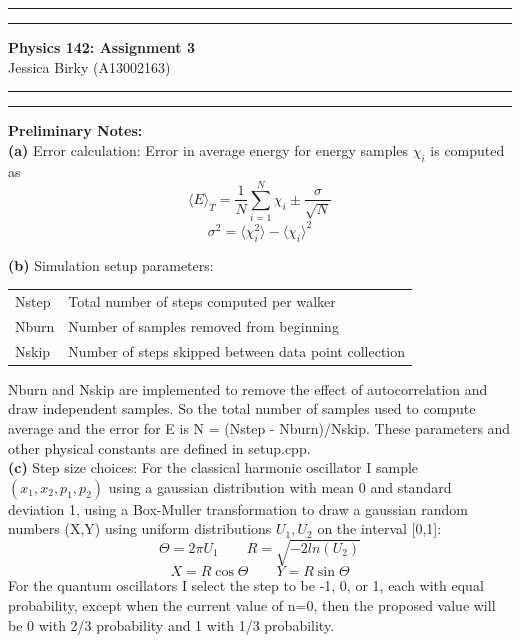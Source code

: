 \documentclass{article}
\newcommand{\mytitle}{Physics 142: Assignment 3}
\begin{document}
\hrule \vspace{1pt} \hrule 
\begin{center}\Large \textbf{\sc \mytitle} \\
\normalsize \sc Jessica Birky (A13002163)
\end{center}
\hrule \vspace{1pt} \hrule 


\bigskip
\textbf{Preliminary Notes:} \\

\textbf{(a)} Error calculation: Error in average energy for energy samples $\chi_{i}$ is computed as 
	\[\langle E\rangle_{T}=\frac{1}{N}\sum_{i=1}^{N} \chi_{i} \pm \frac{\sigma}{\sqrt{N}} \]
	\[\sigma^{2} = \langle \chi_{i}^{2} \rangle - \langle \chi_{i} \rangle^{2} \]

\textbf{(b)} Simulation setup parameters:

\begin{table}[H]
\centering
\begin{tabular}{|l|l|}
	\hline
	Nstep    & Total number of steps computed per walker \\
	Nburn    & Number of samples removed from beginning \\
	Nskip    & Number of steps skipped between data point collection \\
	\hline
\end{tabular}
\end{table}
Nburn and Nskip are implemented to remove the effect of autocorrelation and draw independent samples. So the total number of samples used to compute average and the error for E is N = (Nstep - Nburn)/Nskip. These parameters and other physical constants are defined in setup.cpp. \\

\textbf{(c)} Step size choices: For the classical harmonic oscillator I sample $(x_1, x_2, p_1, p_2)$ using a gaussian distribution with mean 0 and standard deviation 1, using a Box-Muller transformation to draw a gaussian random numbers (X,Y) using uniform distributions $U_1, U_2$ on the interval [0,1]: 
	\[\Theta = 2\pi U_1 \qquad R = \sqrt{-2 ln(U_2)} \]
	\[X = R \cos\Theta \qquad Y = R \sin\Theta \]
For the quantum oscillators I select the step to be -1, 0, or 1, each with equal probability, except when the current value of n=0, then the proposed value will be 0 with 2/3 probability and 1 with 1/3 probability. \\
\end{document}
